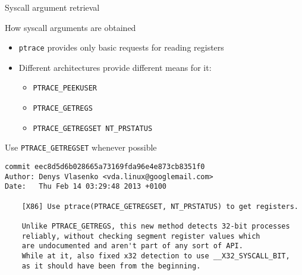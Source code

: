 \documentclass[unicode]{beamer}
\begin{document}
\begin{frame}[fragile]{Syscall argument retrieval}
\begin{block}{\large How syscall arguments are obtained}
\begin{itemize}
  \item \texttt{ptrace} provides only basic requests for reading registers\footnotemark[1]
  \item Different architectures provide different means for it:
  \begin{itemize}
    \item \texttt{PTRACE\_PEEKUSER}
    \item \texttt{PTRACE\_GETREGS}
    \item \texttt{PTRACE\_GETREGSET NT\_PRSTATUS}
  \end{itemize}
\end{itemize}
\end{block}
\pause
\begin{block}{\large Use \texttt{PTRACE\_GETREGSET} whenever possible}
\begin{scriptsize}
\begin{verbatim}
commit eec8d5d6b028665a73169fda96e4e873cb8351f0
Author: Denys Vlasenko <vda.linux@googlemail.com>
Date:   Thu Feb 14 03:29:48 2013 +0100

    [X86] Use ptrace(PTRACE_GETREGSET, NT_PRSTATUS) to get registers.
    
    Unlike PTRACE_GETREGS, this new method detects 32-bit processes
    reliably, without checking segment register values which
    are undocumented and aren't part of any sort of API.
    While at it, also fixed x32 detection to use __X32_SYSCALL_BIT,
    as it should have been from the beginning.
\end{verbatim}
\end{scriptsize}
\end{block}
\end{frame}
\end{document}
